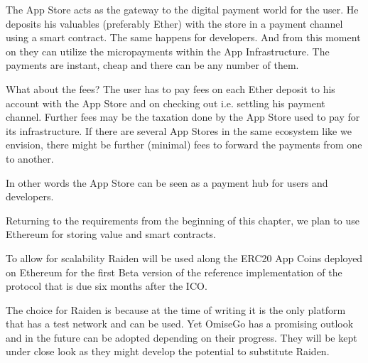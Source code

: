 The App Store acts as the gateway to the digital payment world for the user. He deposits his valuables (preferably Ether) with the store in a payment channel using a smart contract. The same happens for developers. And from this moment on they can utilize the micropayments within the App Infrastructure. The payments are instant, cheap and there can be any number of them.

What about the fees? The user has to pay fees on each Ether deposit to his account with the App Store and on checking out i.e. settling his payment channel. Further fees may be the taxation done by the App Store used to pay for its infrastructure.  If there are several App Stores in the same ecosystem like we envision, there might be further (minimal) fees to forward the payments from one to another.

In other words the App Store can be seen as a payment hub for users and developers.

Returning to the requirements from the beginning of this chapter, we plan to use Ethereum for storing value and smart contracts. 

To allow for scalability Raiden will be used along the ERC20 App Coins deployed on Ethereum for the first Beta version of the reference implementation of the protocol that is due six months after the ICO. %

The choice for Raiden is because at the time of writing it is the only platform that has a test network and can be used. Yet OmiseGo has a promising outlook and in the future can be adopted depending on their progress. They will be kept under close look as they might develop the potential to substitute Raiden.


